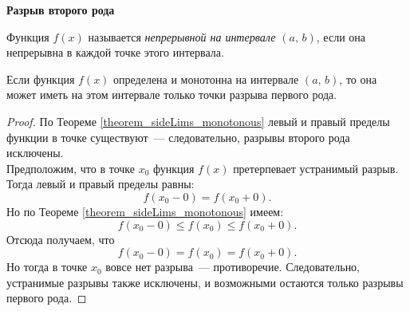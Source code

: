 \begin{center}
\begin{minipage}{0.32\textwidth}
\textbf{Разрыв второго рода}
\end{minipage}
\end{center}



\begin{definition}
Функция \(f(x)\) называется \textit{непрерывной на интервале \((a, \, b)\)},
если она непрерывна в каждой точке этого интервала.
\end{definition}

\begin{theorem}
Если функция \(f(x)\) определена и монотонна на интервале \((a, \, b)\),
то она может иметь на этом интервале только точки разрыва первого рода.

\begin{proof}
По Теореме \ref{theorem_sideLims_monotonous} левый и правый пределы
функции в точке существуют~--- следовательно, разрывы второго рода исключены. \\
Предположим, что в точке \(x_{0}\) функция \(f(x)\) претерпевает устранимый разрыв.
Тогда левый и правый пределы равны:
\[
f(x_{0} - 0) = f(x_{0} + 0).
\]
Но по Теореме \ref{theorem_sideLims_monotonous} имеем:
\[
f(x_{0} - 0) \leq f(x_{0}) \leq f(x_{0} + 0).
\]
Отсюда получаем, что
\[
f(x_{0} - 0) = f(x_{0}) = f(x_{0} + 0).
\]
Но тогда в точке \(x_{0}\) вовсе нет разрыва~--- противоречие.
Следовательно, устранимые разрывы также исключены,
и возможными остаются только разрывы первого рода.
\end{proof}
\end{theorem}

